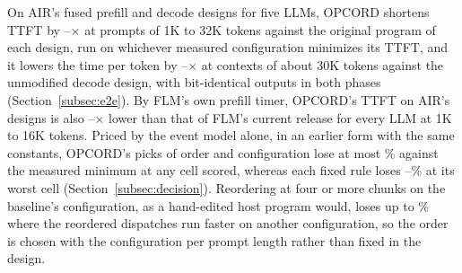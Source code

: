 On AIR's fused prefill and decode designs for five LLMs, OPCORD shortens TTFT by \PrefillGainLo--\PrefillGainHi$\times$ at prompts of 1K to 32K tokens against the original program of each design, run on whichever measured configuration minimizes its TTFT, and it lowers the time per token by \DecodeGainLo--\DecodeGainHi$\times$ at contexts of about 30K tokens against the unmodified decode design, with bit-identical outputs in both phases (Section~\ref{subsec:e2e}).
By FLM's own prefill timer, OPCORD's TTFT on AIR's designs is also \AbsGainLo--\AbsGainHi$\times$ lower than that of FLM's current release for every LLM at 1K to 16K tokens.
Priced by the event model alone, in an earlier form with the same constants, OPCORD's picks of order and configuration lose at most \ChoiceOpcordMax\% against the measured minimum at any cell scored, whereas each fixed rule loses \ChoiceAlwaysMax--\ChoiceFixedSTwoMax\% at its worst cell (Section~\ref{subsec:decision}).
Reordering at four or more chunks on the baseline's configuration, as a hand-edited host program would, loses up to \ChoiceFourBaseMax\% where the reordered dispatches run faster on another configuration, so the order is chosen with the configuration per prompt length rather than fixed in the design.


